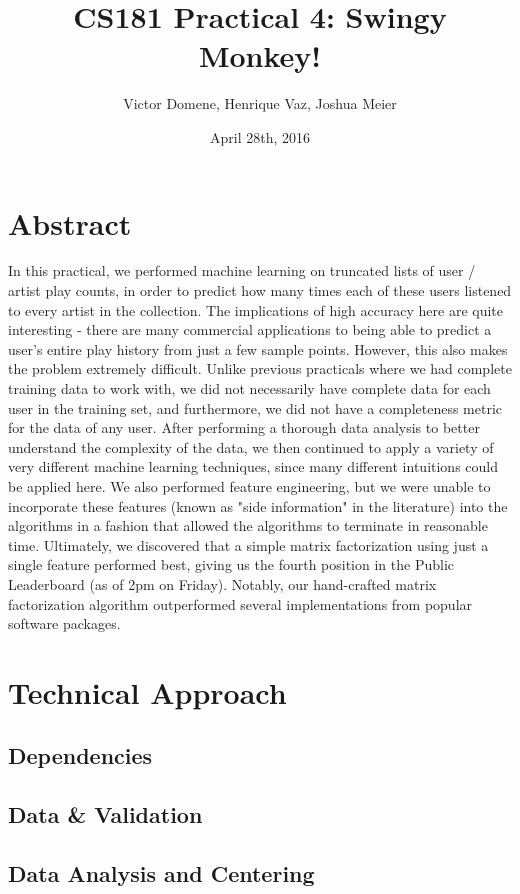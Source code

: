\documentclass[10pt]{article}
\title{CS181 Practical 4: Swingy Monkey!}
\author{Victor Domene, Henrique Vaz, Joshua Meier}
\date{April 28th, 2016}
\begin{document}
\maketitle

\section{Abstract} In this practical, we performed machine learning on
truncated lists of user / artist play counts, in order to predict how many
times each of these users listened to every artist in the collection. The
implications of high accuracy here are quite interesting - there are many
commercial applications to being able to predict a user's entire play history
from just a few sample points. However, this also makes the problem extremely
difficult. Unlike previous practicals where we had complete training data to
work with, we did not necessarily have complete data for each user in the
training set, and furthermore, we did not have a completeness metric for the
data of any user. After performing a thorough data analysis to better
understand the complexity of the data, we then continued to apply a variety of
very different machine learning techniques, since many different intuitions
could be applied here. We also performed feature engineering, but we were
unable to incorporate these features (known as "side information" in the
literature) into the algorithms in a fashion that allowed the algorithms to
terminate in reasonable time. Ultimately, we discovered that a simple matrix
factorization using just a single feature performed best, giving us the fourth
position in the Public Leaderboard (as of 2pm on Friday). Notably, our
hand-crafted matrix factorization algorithm outperformed several
implementations from popular software packages. 

\section{Technical Approach} 

\subsection{Dependencies}

\subsection{Data \& Validation} 

\subsection{Data Analysis and Centering} 
\end{document}
